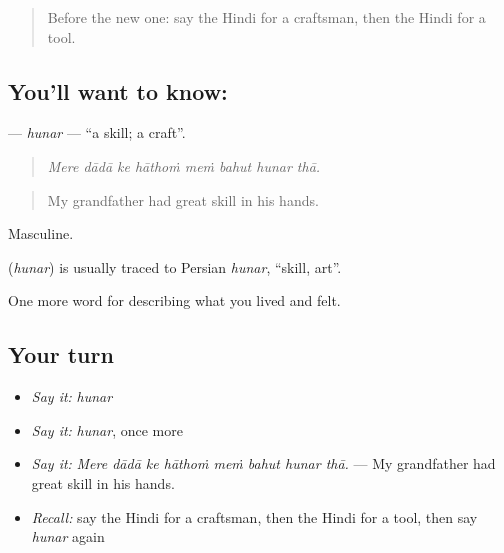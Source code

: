 \label{lesson:HI-C506-hunar}



\begin{quote}
Before the new one: say the Hindi for a craftsman, then the Hindi for a tool.
\end{quote}

\subsection*{You'll want to know: }
\textbf{} — \emph{hunar} — \textquotedblleft{}a skill; a craft\textquotedblright{}.

\begin{quote}
       
\end{quote}

\begin{quote}
\emph{Mere dādā ke hāthoṁ meṁ bahut hunar thā.}
\end{quote}

\begin{quote}
My grandfather had great skill in his hands.
\end{quote}

Masculine.

\begin{cousinweb}
\textbf{} (\emph{hunar}) is usually traced to Persian \emph{hunar}, \textquotedblleft{}skill, art\textquotedblright{}.
\end{cousinweb}

\begin{grammarlens}[title={What you've built}]
One more word for describing what you lived and felt.
\end{grammarlens}

\subsection*{Your turn}
\begin{itemize}
\raggedright
  \item \emph{Say it:} \emph{hunar}
  \item \emph{Say it:} \emph{hunar}, once more
  \item \emph{Say it:} \emph{Mere dādā ke hāthoṁ meṁ bahut hunar thā.} — My grandfather had great skill in his hands.
  \item \emph{Recall:} say the Hindi for a craftsman, then the Hindi for a tool, then say \emph{hunar} again
\end{itemize}

